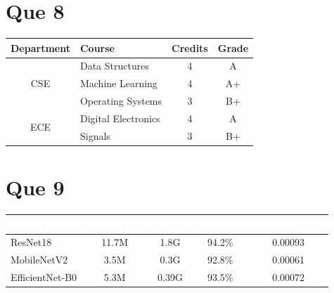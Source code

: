 \documentclass[11pt,a4paper]{article}
\begin{document}
\section*{Que 8}
\begin{center}
\begin{tabular}{|c|l|c|c|}
    \hline
    \textbf{Department} & \textbf{Course} & \textbf{Credits} & \textbf{Grade} \\
    \hline
    \multirow{3}{*}{CSE} & Data Structures   & 4 & A  \\ \cline{2-4}
                         & Machine Learning  & 4 & A+ \\ \cline{2-4}
                         & Operating Systems & 3 & B+ \\ \hline
    \multirow{2}{*}{ECE} & Digital Electronics & 4 & A  \\ \cline{2-4}
                         & Signals             & 3 & B+ \\ \hline
\end{tabular}
\end{center}

\section*{Que 9}
\begin{center}
\begin{tabular}{|l|c|c|c|c|}
    \hline
    \rowcolor{headblue}
    \textcolor{white}{\textbf{Model}} &
    \textcolor{white}{\textbf{Parameters}} &
    \textcolor{white}{\textbf{FLOPs}} &
    \textcolor{white}{\textbf{Accuracy}} &
    \textcolor{white}{\textbf{Energy (kWh)}} \\
    \hline
    ResNet18        & 11.7M & 1.8G  & 94.2\% & 0.00093 \\
    \rowcolor{lightblue}
    MobileNetV2     & 3.5M  & 0.3G  & 92.8\% & 0.00061 \\
    EfficientNet-B0 & 5.3M  & 0.39G & 93.5\% & 0.00072 \\
    \hline
\end{tabular}
\end{center}

\end{document}
